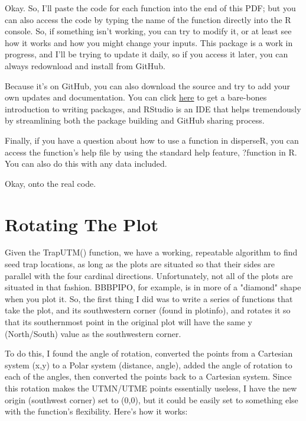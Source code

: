 \documentclass{article}
\begin{document}
Okay. So, I'll paste the code for each function into the end of this PDF; but you can also access the code by typing the name of the function directly into the R console. So, if something isn't working, you can try to modify it, or at least see how it works and how you might change your inputs. This package is a work in progress, and I'll be trying to update it daily, so if you access it later, you can always redownload and install from GitHub.

Because it's on GitHub, you can also download the source and try to add your own updates and documentation. You can click \href{http://hilaryparker.com/2014/04/29/writing-an-r-package-from-scratch/}{here} to get a bare-bones introduction to writing packages, and RStudio is an IDE that helps tremendously by streamlining both the package building and GitHub sharing process.

Finally, if you have a question about how to use a function in disperseR, you can access the function's help file by using the standard help feature, ?function in R. You can also do this with any data included.

Okay, onto the real code.

\section{Rotating The Plot}

Given the TrapUTM() function, we have a working, repeatable algorithm to find seed trap locations, as long as the plots are situated so that their sides are parallel with the four cardinal directions. Unfortunately, not all of the plots are situated in that fashion. BBBPIPO, for example, is in more of a "diamond" shape when you plot it. So, the first thing I did was to write a series of functions that take the plot, and its southwestern corner (found in plotinfo), and rotates it so that its southernmost point in the original plot will have the same y (North/South) value as the southwestern corner.

To do this, I found the angle of rotation, converted the points from a Cartesian system (x,y) to a Polar system (distance, angle), added the angle of rotation to each of the angles, then converted the points back to a Cartesian system. Since this rotation makes the UTMN/UTME points essentially useless, I have the new origin (southwest corner) set to (0,0), but it could be easily set to something else with the function's flexibility. Here's how it works:
\end{document}
